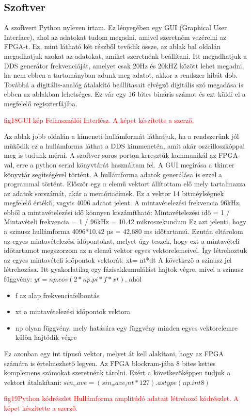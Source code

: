 \documentclass[a4paper,12pt]{article}
\begin{document}
		\subsection{Szoftver}
		A szoftvert Python nyleven írtam. Ez lényegében egy GUI (Graphical User Interface), ahol az adatokat tudom megadni, amivel szeretném vezérelni az FPGA-t. Ez, mint látható két részből tevődik össze, az ablak bal oldalán megadhatjuk azokat az adatokat, amiket szeretnénk beállítani. Itt megadhatjuk a DDS generátor frekvenciáját, amelyet csak 20Hz és 20kHZ között lehet megadni, ha nem ebben a tartományban adunk meg adatot, akkor a rendszer hibát dob. Továbbá a digitális-analóg átalakító beállítasait elvégző digitális szó megadása is ebben az ablakban lehetséges. Ez vár egy 16 bites bináris számot és ezt küldi el a megfelelő regiszterfájlba. 
		\begin{center}
			\textcolor{red}{
				fig18GUI kép
				Felhasználói Interfész. A képet készítette a szerző.
			}
		\end{center}
		\newpage
		Az ablak jobb oldalán a kimeneti hullámformát láthatjuk, ha a rendszerünk jól működik ez a hullámforma láthat a DDS kimmenetén, amit akár oszcilloszkóppal meg is tudunk mérni. 
		A szoftver soros porton keresztük kommunikál az FPGA-val, erre a python serial könyvtárát használtam fel. A GUI megírása a tkinter könyvtár segítségével történt.
		A hullámforma adatok generálása is ezzel a programmal történt. Először egy n elemű vektort állítottam elő mely tartalmazza az adatok sorszámát, akár a memóriacímek. Ez a vektor 14 bitméylségnek megfelelő értékű, vagyis 4096 adatot jelent. A mintavételezési frekvencia 96kHz, ebből a mintavételezési idő könnyen kiszámítható: 
		Mintavételezési idő = 1 / Mintavételi frekvencia = 1 / 96kHz = 10.42 mikroszekundum
		Ez azt jelenti, hogy a szinusz hullámforma 4096*10.42 µs = 42,680 ms időtartamú.
		Ezután eltárolom az egyes mintavételezési időpontokat, melyet úgy teszek, hogy ezt a mintavételi időtartamot megszorzom az n elemű vektor egyes vektorelemeivel. Így létrehoztuk az egyes mintavételi időpontok vektorát: xt= nt*dt
		A következő a szinusz jel létrehozása. Itt gyakorlatilag egy fázisakkumulálást hajtok végre, mivel a szinusz függvény:
		 $yt = np.cos(2*np.pi*f*xt)$, ahol
		 \begin{itemize}
		 	\item f az alap frekvenciafelbontás
		 	\item xt a mintavételezési időpontok vektora
		 	\item np olyan függvény, mely hatására egy függvény minden egyes vektorelemre külön hajtódik végre
		 \end{itemize}
	 	Ez azonban egy int típusú vektor, melyet át kell alakítani, hogy az FPGA számára is értelmezhető legyen. Az FPGA blockram-jába 8 bites kettes komplemens számokat szeretnénk tárolni. Ezért a következőképpen tudjuk a vektort átalakítani:
	 	$sin_wave = (sin_wave_int *127). astype(np.int8)$
	 	\begin{center}
	 		\textcolor{red}{
	 			fig19Python kódrészlet
	 			Hullámforma amplitúdó adatait létrehozó kódrészlet. A képet készítette a szerző.
	 		}
	 	\end{center}
	\newpage
\end{document}
